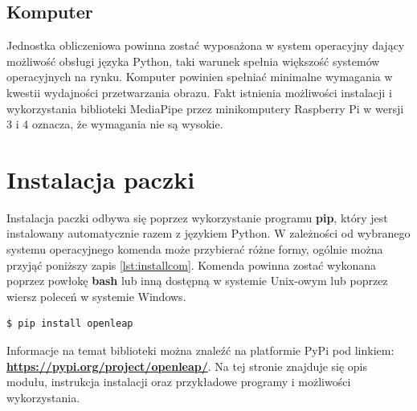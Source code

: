 \subsection{Komputer}
\quad Jednostka obliczeniowa powinna zostać wyposażona w system operacyjny dający możliwość obsługi języka Python, taki warunek spełnia większość systemów operacyjnych na rynku. Komputer powinien spełniać minimalne wymagania w kwestii wydajności przetwarzania obrazu. Fakt istnienia możliwości instalacji i wykorzystania biblioteki MediaPipe przez minikomputery Raspberry Pi w wersji 3 i 4 oznacza, że wymagania nie są wysokie. 

\section{Instalacja paczki}
\quad Instalacja paczki odbywa się poprzez wykorzystanie programu \textbf{pip}, który jest instalowany automatycznie razem z językiem Python. W zależności od wybranego systemu operacyjnego komenda może przybierać różne formy, ogólnie można przyjąć poniższy zapis \ref{lst:installcom}. Komenda powinna zostać wykonana poprzez powłokę \textbf{bash} lub inną dostępną w systemie Unix-owym lub poprzez wiersz poleceń w systemie Windows.\newline

\begin{lstlisting}[language=bash, style=command, label={lst:installcom}, caption={Instalacja paczki}]
    $ pip install openleap
\end{lstlisting}

\quad Informacje na temat biblioteki można znaleźć na platformie PyPi \cite{bib:pypi} pod linkiem: \textbf{\href{https://pypi.org/project/openleap/}{https://pypi.org/project/openleap/}}. Na tej stronie znajduje się opis modułu, instrukcja instalacji oraz przykładowe programy i możliwości wykorzystania.


